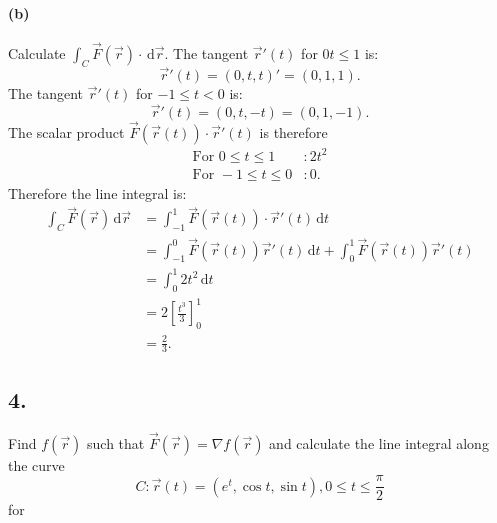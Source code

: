\paragraph{(b)} Calculate $\int_{C} \Vec{F} \left( \Vec{r} \right) \cdot \, \mathrm{d}\Vec{r}$.
\bigbreak
The tangent $\Vec{r}'(t)$ for $0 t \leq 1$ is:
\[ 
\Vec{r}'(t) = (0, t, t)' = (0,1,1)
.\]
The tangent $\Vec{r}'(t)$ for $-1 \leq t < 0$ is:
\[ 
\Vec{r}'(t) = (0, t, -t) = (0, 1, -1)
.\]
The scalar product $\Vec{F}\left( \Vec{r}(t) \right)\cdot \Vec{r}'(t)$ is therefore
\begin{align*}
  \text{For }0 \leq t \leq 1 &: 2t^2 \\
  \text{For } -1 \leq t \leq 0 &: 0
.\end{align*}
Therefore the line integral is:
\begin{align*}
  \int_{C} \Vec{F} \left( \Vec{r} \right) \, \mathrm{d}\Vec{r} &= \int_{-1}^{1} \Vec{F} \left( \Vec{r}(t) \right)\cdot \Vec{r}'(t) \, \mathrm{d}t \\
  &= \int_{-1}^{0} \Vec{F} \left( \Vec{r}(t) \right) \Vec{r}'(t) \, \mathrm{d}t + \int_{0}^{1} \Vec{F} \left( \Vec{r}(t) \right) \Vec{r}'(t) \\
  &= \int_{0}^{1} 2t^2 \, \mathrm{d}t \\
  &= 2 \left[ \frac{t^3}{3} \right]_{0}^{1} \\
  &= \frac{2}{3}
.\end{align*}



\subsection*{4.} Find $f(\Vec{r})$ such that $\Vec{F}\left( \Vec{r} \right) = \nabla f \left( \Vec{r} \right) $ and calculate the line integral along the curve
\[ 
C : \Vec{r}(t) = \left( e^{t}, \cos t, \sin t \right), 0 \leq t \leq \frac{\pi}{2}
\]
for

